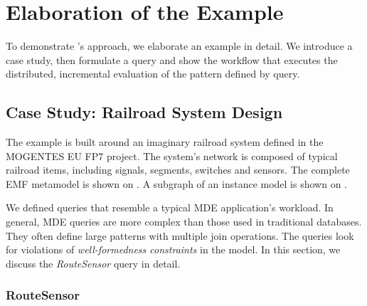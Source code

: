 \section{Elaboration of the Example}
\label{overview-elaboration}

To demonstrate \iqd{}'s approach, we elaborate an example in detail. We introduce a case study, then formulate a query and show the workflow that executes the distributed, incremental evaluation of the pattern defined by query.



\subsection{Case Study: Railroad System Design}
\label{railroad-system}


The example is built around an imaginary railroad system defined in the \mbox{MOGENTES} EU FP7 \cite{MOGENTES} project. The system's network is composed of typical railroad items, including signals, segments, switches and sensors. The complete EMF metamodel is shown on . A subgraph of an instance model is shown on .

We defined queries that resemble a typical MDE application's workload. In general, MDE queries are more complex than those used in traditional databases. They often define large patterns with multiple join operations. The queries look for violations of \emph{well-formedness constraints} in the model. In this section, we discuss the \textit{RouteSensor} query in detail.


\subsubsection{RouteSensor}


